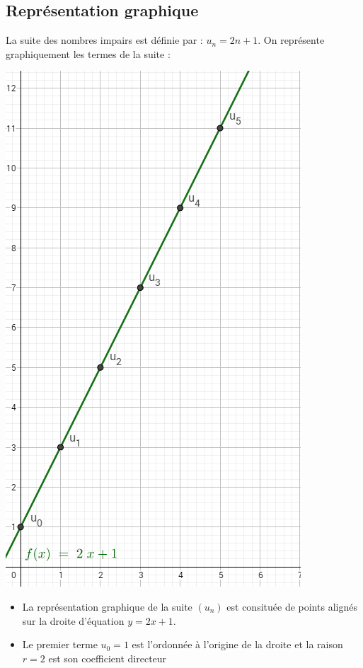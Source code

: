 \documentclass[12pt,a4paper]{article}
\begin{document}
\subsection{Représentation graphique}	

\begin{myex}
	La suite des nombres impairs est définie par : $u_{n} = 2n +1$.
	On représente graphiquement les termes de la suite :
	
	\begin{multicols}{2}
			\includegraphics[scale=0.5]{img/arith}
			
			\begin{itemize}
				\item La représentation graphique de la suite $(u_n)$ est consituée de points alignés sur la droite d'équation $y=2x+1$.
				\item Le premier terme $u_0=1$ est l'ordonnée à l'origine de la droite et la raison $r=2$ est son coefficient directeur
			\end{itemize}
			
	\end{multicols}

\end{myex}	
\end{document}

